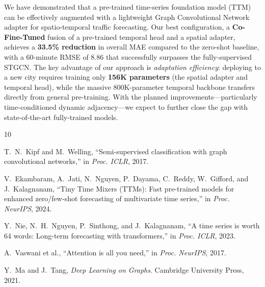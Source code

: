 \documentclass[11pt, a4paper]{article}
\begin{document}
We have demonstrated that a pre-trained time-series foundation model (TTM) can be effectively augmented with a lightweight Graph Convolutional Network adapter for spatio-temporal traffic forecasting. Our best configuration, a \textbf{Co-Fine-Tuned} fusion of a pre-trained temporal head and a spatial adapter, achieves a \textbf{33.5\% reduction} in overall MAE compared to the zero-shot baseline, with a 60-minute RMSE of 8.86 that successfully surpasses the fully-supervised STGCN. The key advantage of our approach is \textit{adaptation efficiency}: deploying to a new city requires training only \textbf{156K parameters} (the spatial adapter and temporal head), while the massive 800K-parameter temporal backbone transfers directly from general pre-training. With the planned improvements---particularly time-conditioned dynamic adjacency---we expect to further close the gap with state-of-the-art fully-trained models.

\begin{thebibliography}{10}

T.~N.~Kipf and M.~Welling, ``Semi-supervised classification with graph convolutional networks,'' in \textit{Proc. ICLR}, 2017.

V.~Ekambaram, A.~Jati, N.~Nguyen, P.~Dayama, C.~Reddy, W.~Gifford, and J.~Kalagnanam, ``Tiny Time Mixers (TTMs): Fast pre-trained models for enhanced zero/few-shot forecasting of multivariate time series,'' in \textit{Proc. NeurIPS}, 2024.

Y.~Nie, N.~H.~Nguyen, P.~Sinthong, and J.~Kalagnanam, ``A time series is worth 64 words: Long-term forecasting with transformers,'' in \textit{Proc. ICLR}, 2023.

A.~Vaswani et al., ``Attention is all you need,'' in \textit{Proc. NeurIPS}, 2017.

Y.~Ma and J.~Tang, \textit{Deep Learning on Graphs}. Cambridge University Press, 2021.

\end{thebibliography}
\end{document}
